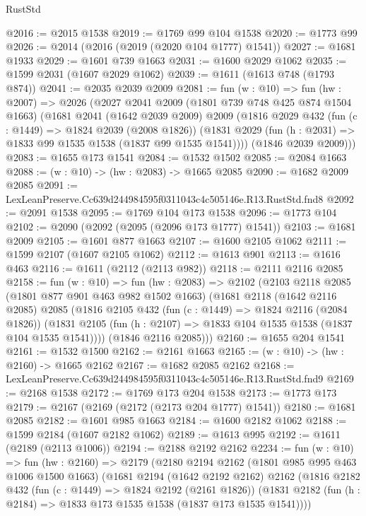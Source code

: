 \begin{lexlean}{RustStd}
\begin{coremodule}
@2016 := @2015 @1538
@2019 := @1769 @99 @104 @1538
@2020 := @1773 @99
@2026 := @2014 (@2016 (@2019 (@2020 @104 @1777) @1541))
@2027 := @1681 @1933
@2029 := @1601 @739 @1663
@2031 := @1600 @2029 @1062
@2035 := @1599 @2031 (@1607 @2029 @1062)
@2039 := @1611 (@1613 @748 (@1793 @874))
@2041 := @2035 @2039 @2009
@2081 := fun (w : @10) =>
  fun (hw : @2007) =>
  @2026
    (@2027
      @2041
      @2009
      (@1801 @739 @748 @425 @874 @1504 @1663)
      (@1681
        @2041
        (@1642 @2039 @2009)
        @2009
        (@1816
          @2029
          @432
          (fun (c : @1449) => @1824 @2039 (@2008 @1826))
          (@1831 @2029 (fun (h : @2031) => @1833 @99 @1535 @1538 (@1837 @99 @1535 @1541))))
        (@1846 @2039 @2009)))
@2083 := @1655 @173 @1541
@2084 := @1532 @1502
@2085 := @2084 @1663
@2088 := (w : @10) -> (hw : @2083) -> @1665 @2085
@2090 := @1682 @2009 @2085
@2091 := LexLeanPreserve.Cc639d244984595f0311043c4c505146e.R13.RustStd.fnd8
@2092 := @2091 @1538
@2095 := @1769 @104 @173 @1538
@2096 := @1773 @104
@2102 := @2090 (@2092 (@2095 (@2096 @173 @1777) @1541))
@2103 := @1681 @2009
@2105 := @1601 @877 @1663
@2107 := @1600 @2105 @1062
@2111 := @1599 @2107 (@1607 @2105 @1062)
@2112 := @1613 @901
@2113 := @1616 @463
@2116 := @1611 (@2112 (@2113 @982))
@2118 := @2111 @2116 @2085
@2158 := fun (w : @10) =>
  fun (hw : @2083) =>
  @2102
    (@2103
      @2118
      @2085
      (@1801 @877 @901 @463 @982 @1502 @1663)
      (@1681
        @2118
        (@1642 @2116 @2085)
        @2085
        (@1816
          @2105
          @432
          (fun (c : @1449) => @1824 @2116 (@2084 @1826))
          (@1831 @2105 (fun (h : @2107) => @1833 @104 @1535 @1538 (@1837 @104 @1535 @1541))))
        (@1846 @2116 @2085)))
@2160 := @1655 @204 @1541
@2161 := @1532 @1500
@2162 := @2161 @1663
@2165 := (w : @10) -> (hw : @2160) -> @1665 @2162
@2167 := @1682 @2085 @2162
@2168 := LexLeanPreserve.Cc639d244984595f0311043c4c505146e.R13.RustStd.fnd9
@2169 := @2168 @1538
@2172 := @1769 @173 @204 @1538
@2173 := @1773 @173
@2179 := @2167 (@2169 (@2172 (@2173 @204 @1777) @1541))
@2180 := @1681 @2085
@2182 := @1601 @985 @1663
@2184 := @1600 @2182 @1062
@2188 := @1599 @2184 (@1607 @2182 @1062)
@2189 := @1613 @995
@2192 := @1611 (@2189 (@2113 @1006))
@2194 := @2188 @2192 @2162
@2234 := fun (w : @10) =>
  fun (hw : @2160) =>
  @2179
    (@2180
      @2194
      @2162
      (@1801 @985 @995 @463 @1006 @1500 @1663)
      (@1681
        @2194
        (@1642 @2192 @2162)
        @2162
        (@1816
          @2182
          @432
          (fun (c : @1449) => @1824 @2192 (@2161 @1826))
          (@1831 @2182 (fun (h : @2184) => @1833 @173 @1535 @1538 (@1837 @173 @1535 @1541))))

\end{coremodule}
\end{lexlean}
